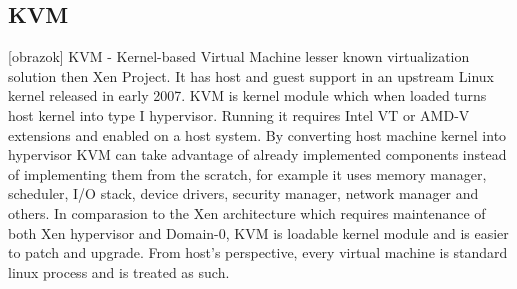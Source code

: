 \begin{enumerate}
\section{KVM}
[obrazok] KVM - Kernel-based Virtual Machine lesser known virtualization solution then Xen Project. It has host and guest support in an upstream Linux kernel released in early 2007. KVM is kernel module which when loaded turns host kernel into type I hypervisor. Running it requires Intel VT or AMD-V extensions and enabled on a host system. By converting host machine kernel into hypervisor KVM can take advantage of already implemented components instead of implementing them from the scratch, for example it uses memory manager, scheduler, I/O stack, device drivers, security manager, network manager and others. In comparasion to the Xen architecture which requires maintenance of both Xen hypervisor and Domain-0, KVM is loadable kernel module and is easier to patch and upgrade. From host's perspective, every virtual machine is standard linux process and is treated as such.


\end{enumerate}
